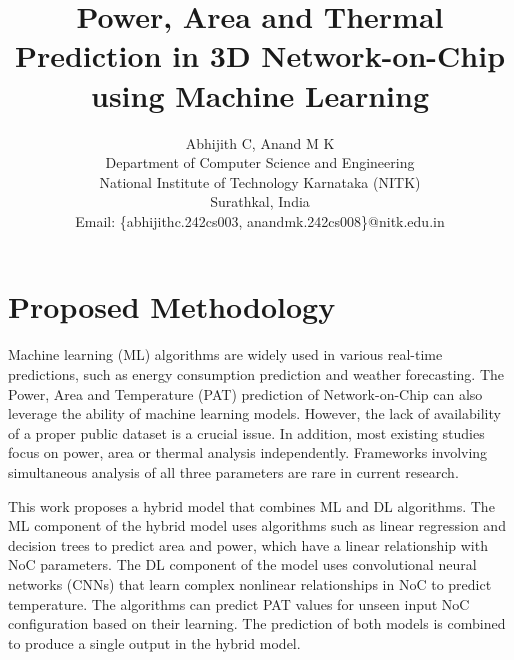 \documentclass[conference]{IEEEtran}
\begin{document}
\title{Power, Area and Thermal Prediction in 3D Network-on-Chip using Machine Learning}

\author{Abhijith C, Anand M K \\

Department of Computer Science and Engineering \\ 
	National Institute of Technology Karnataka (NITK) \\ 
	Surathkal, India\\
Email: \{abhijithc.242cs003, anandmk.242cs008\}@nitk.edu.in}


\maketitle

\section{Proposed Methodology}

\hspace{1cm}

Machine learning (ML) algorithms are widely used in various real-time predictions, such as energy consumption prediction and weather forecasting. The Power, Area and Temperature (PAT) prediction of Network-on-Chip can also leverage the ability of machine learning models. However, the lack of availability of a proper public dataset is a crucial issue. In addition, most existing studies focus on power, area or thermal analysis independently. Frameworks involving simultaneous analysis of all three parameters are rare in current research. 

This work proposes a hybrid model that combines ML and DL algorithms. The ML component of the hybrid model uses algorithms such as linear regression and decision trees to predict area and power, which have a linear relationship with NoC parameters. The DL component of the model uses convolutional neural networks (CNNs) that learn complex nonlinear relationships in NoC to predict temperature. The algorithms can predict PAT values for unseen input NoC configuration based on their learning. The prediction of both models is combined to produce a single output in the hybrid model. 
\end{document}
